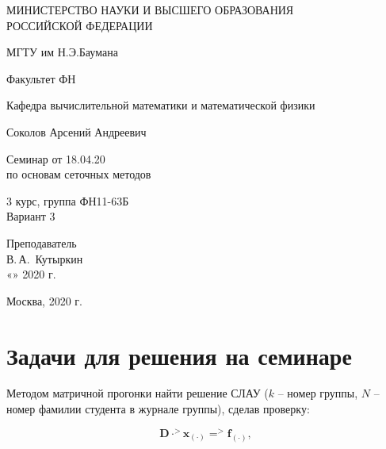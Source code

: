 \documentclass[14pt,a4paper]{scrartcl}
\begin{document}
	\begin{titlepage}
	\begin{center}
		\large
		МИНИСТЕРСТВО НАУКИ И ВЫСШЕГО ОБРАЗОВАНИЯ\\ РОССИЙСКОЙ ФЕДЕРАЦИИ
		
		\vspace{0.5cm}
		
		МГТУ им Н.Э.Баумана
		\vspace{0.25cm}
		
		Факультет ФН
		
		Кафедра вычислительной математики и математической физики
		\vfill
		
		
		Соколов Арсений Андреевич\\
		\vfill
		
		
		{\LARGE Семинар от 18.04.20 \\ по основам сеточных методов\\[2mm]
		}
		\bigskip
		
		3 курс, группа ФН11-63Б\\
		Вариант 3
	\end{center}
	\vfill
	
	\newlength{\ML}
	\hfill\begin{minipage}{0.4\textwidth}
		Преподаватель\\
		\underline{\hspace{3cm}} В.\,А.~Кутыркин\\
		«\underline{\hspace{0.7cm}}» \underline{\hspace{1.71cm}} 2020 г.
	\end{minipage}%
	\bigskip
	
	
	\vfill
	
	\begin{center}
		Москва, 2020 г.
	\end{center}
\end{titlepage}

\section*{Задачи для решения на семинаре}

Методом матричной прогонки найти решение СЛАУ ($k$ -- номер группы, $N$ -- номер фамилии студента в журнале группы), сделав проверку:

\begin{equation}\label{1}
	\mathbf{D} \cdot ^>\mathbf{x}_{(\cdot)} = ^>\mathbf{f}_{(\cdot)},
\end{equation}
\end{document}
